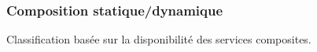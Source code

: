     




    
      \subsubsection{Composition statique/dynamique}
      \label{sec:comp-stat}
      Classification basée sur la disponibilité des services composites.

